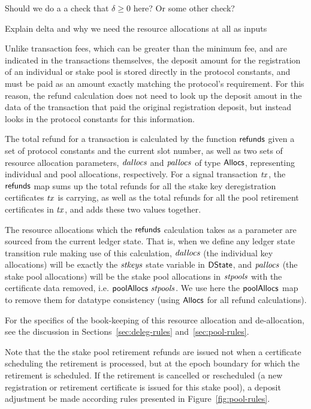 \documentclass[11pt,a4paper]{article}
\newcommand{\Allocs}{\type{Allocs}}
\newcommand{\DState}{\type{DState}}
\theoremstyle{definition}
\theoremstyle{definition}
\begin{document}
\begin{todo}
Should we do a a check that $\delta \geq 0$ here? Or some other check?
\end{todo}

\begin{todo}
Explain delta and why we need the resource allocations at all as inputs
\end{todo}

Unlike transaction fees, which can be greater than the minimum fee, and are
indicated in the transactions themselves, the deposit amount for the registration
of an individual or stake pool is stored directly in the protocol constants,
and must be paid as an amount exactly matching the protocol's requirement.
For this reason, the refund calculation does not need to look up the deposit
amout in the data of the transaction
that paid the original registration deposit, but instead looks in the protocol
constants for this information.

The total refund for a transaction is calculated by the function $\mathsf{refunds}$
given a set of protocol constants and the current slot number, as well as
two sets of resource allocation parameters,
$\mathit{dallocs}$ and $\mathit{pallocs}$ of type $\Allocs$, representing
individual and pool allocations, respectively. For a signal transaction $\mathit{tx}$,
the $\mathsf{refunds}$ map
sums up the total refunds for all the stake key deregistration certificates
$\mathit{tx}$ is carrying, as well as the
total refunds for all the pool retirement certificates in
$\mathit{tx}$, and adds these two values together.

The resource allocations which the $\mathsf{refunds}$ calculation takes
as a parameter are sourced from the current ledger state. That is,
when we define any ledger state transition rule making use of this calculation,
$\mathit{dallocs}$ (the individual key allocations) will be exactly the
$\mathit{stkeys}$ state variable in $\DState$,
and $\mathit{pallocs}$ (the stake pool allocations) will be the stake pool
allocations in $\mathit{stpools}$ with
the certificate data removed, i.e. $\mathsf{poolAllocs}~\mathit{stpools}$.
We use here the $\mathsf{poolAllocs}$ map to remove them for
datatype consistency (using $\Allocs$ for all refund calculations).

For the specifics of the book-keeping of this resource allocation and
de-allocation, see the
discussion in Sections~\ref{sec:deleg-rules} and~\ref{sec:pool-rules}.

Note that the the stake pool retirement refunds are issued not when a certificate
scheduling the retirement is processed, but at the epoch boundary for which
the retirement is scheduled. If the retirement is cancelled or rescheduled
(a new registration or retirement
certificate is issued for this stake pool), a deposit adjustment
be made according rules presented in Figure~\cref{fig:pool-rules}.
\end{document}
